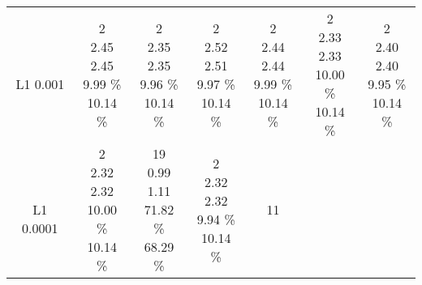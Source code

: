 \begin{center}
\begin{tabular}{ |c|c|c|c|c|c|c| }
{} \\
\hline
\thead{\\L1 0.001} & \makecell{
2 \\
2.45 \\
2.45 \\
9.99 \% \\
10.14 \% \\
} & \makecell{
2 \\
2.35 \\
2.35 \\
9.96 \% \\
10.14 \% \\
} & \makecell{
2 \\
2.52 \\
2.51 \\
9.97 \% \\
10.14 \% \\
} & \makecell{
2 \\
2.44 \\
2.44 \\
9.99 \% \\
10.14 \% \\
} & \makecell{
2 \\
2.33 \\
2.33 \\
10.00 \% \\
10.14 \% \\
} & \makecell{
2 \\
2.40 \\
2.40 \\
9.95 \% \\
10.14 \% \\
} \\
\hline
\thead{\\L1 0.0001} & \makecell{
2 \\
2.32 \\
2.32 \\
10.00 \% \\
10.14 \% \\
} & \makecell{
19 \\
0.99 \\
1.11 \\
71.82 \% \\
68.29 \% \\
} & \makecell{
2 \\
2.32 \\
2.32 \\
9.94 \% \\
10.14 \% \\
} & \makecell{
11 \\
}
\end{tabular}
\end{center}
